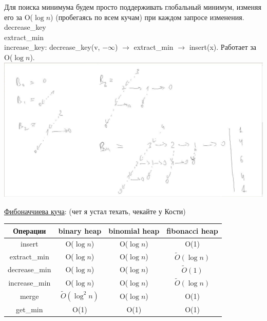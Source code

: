 \documentclass{article}
\newcommand{\tu}[1]{\underline{#1}}
\begin{document}
Для поиска минимума будем просто поддерживать глобальный минимум, изменяя его за O($\log n$) (пробегаясь по всем кучам) при каждом запросе изменения. \\

decrease\_key \\

extract\_min \\

increase\_key: decrease\_key(v, $-\infty$) $\to$ extract\_min $\to$ insert(x). Работает за O($\log n$). \\ 

\includegraphics[width=15cm]{pictures/binominial_heap.png}

\tu{Фибоначчиева куча}: (чет я устал техать, чекайте у Кости)

\begin{center}
\begin{tabular}{|c|c|c|c|}
\hline
Операции        &   binary heap             & binomial heap & fibonacci heap        \\
\hline
insert          &   O($\log n$)             & O($\log n$)   & O(1)                  \\
extract\_min    &   O($\log n$)             & O($\log n$)   & $\tilde{O}(\log n)$   \\
decrease\_min   &   O($\log n$)             & O($\log n$)   & $\tilde{O}(1)$        \\
increase\_min   &   O($\log n$)             & O($\log n$)   & $\tilde{O}(\log n)$   \\
merge           &   $\tilde{O}(\log^2 n)$   & O($\log n$)   & O(1)                  \\
get\_min        &   O(1)                    & O(1)          & O(1)                  \\
\hline
\end{tabular}
\end{center}
\end{document}

